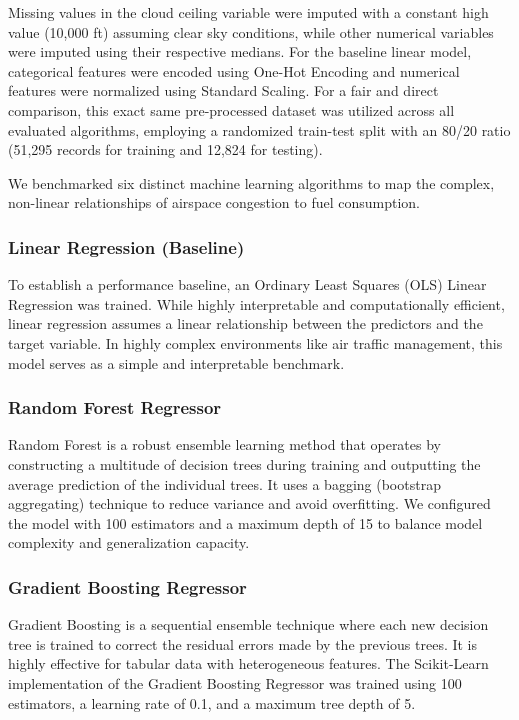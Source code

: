 Missing values in the cloud ceiling variable were imputed with a constant high value (10,000 ft) assuming clear sky conditions, while other numerical variables were imputed using their respective medians. For the baseline linear model, categorical features were encoded using One-Hot Encoding and numerical features were normalized using Standard Scaling. For a fair and direct comparison, this exact same pre-processed dataset was utilized across all evaluated algorithms, employing a randomized train-test split with an 80/20 ratio (51,295 records for training and 12,824 for testing).

We benchmarked six distinct machine learning algorithms to map the complex, non-linear relationships of airspace congestion to fuel consumption.

\subsubsection{Linear Regression (Baseline)}
To establish a performance baseline, an Ordinary Least Squares (OLS) Linear Regression \cite{hastie2009elements} was trained. While highly interpretable and computationally efficient, linear regression assumes a linear relationship between the predictors and the target variable. In highly complex environments like air traffic management, this model serves as a simple and interpretable benchmark.

\subsubsection{Random Forest Regressor}
Random Forest \cite{breiman2001random} is a robust ensemble learning method that operates by constructing a multitude of decision trees during training and outputting the average prediction of the individual trees. It uses a bagging (bootstrap aggregating) technique to reduce variance and avoid overfitting. We configured the model with 100 estimators and a maximum depth of 15 to balance model complexity and generalization capacity.

\subsubsection{Gradient Boosting Regressor}
Gradient Boosting \cite{friedman2001greedy} is a sequential ensemble technique where each new decision tree is trained to correct the residual errors made by the previous trees. It is highly effective for tabular data with heterogeneous features. The Scikit-Learn implementation of the Gradient Boosting Regressor was trained using 100 estimators, a learning rate of 0.1, and a maximum tree depth of 5.

